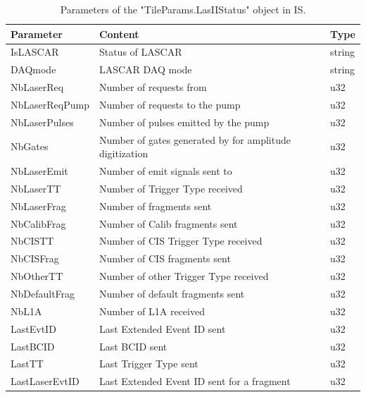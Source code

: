 \begin{appendices}
\vspace*{5cm}
\newpage


\begin{table}[htbp]
  \begin{center}
\caption{Parameters of the "TileParams.LasIIStatus" object in IS.}\label{tab:IS:lasIIstatus}
{\footnotesize
    \begin{tabular}{lll}
      \hline\hline
      Parameter & Content & Type \\
      \hline
      IsLASCAR & Status of LASCAR & string \\
      DAQmode & LASCAR DAQ mode & string \\
      NbLaserReq & Number of \las{} requests from \shaft{} & u32 \\
      NbLaserReqPump & Number of \las{} requests to the pump & u32 \\
      NbLaserPulses & Number of \las{} pulses emitted by the pump & u32 \\
      NbGates & Number of gates generated by \lascar{} for amplitude digitization & u32 \\
      NbLaserEmit & Number of \las{} emit signals sent to \shaft{} & u32 \\
      NbLaserTT & Number of \las{} Trigger Type received & u32 \\
      NbLaserFrag & Number of \las{} fragments sent & u32 \\
      NbCalibFrag & Number of Calib fragments sent & u32 \\
      NbCISTT & Number of CIS Trigger Type received & u32 \\
      NbCISFrag & Number of CIS fragments sent & u32 \\
      NbOtherTT & Number of other Trigger Type received & u32 \\
      NbDefaultFrag & Number of default fragments sent & u32 \\
      NbL1A & Number of L1A received & u32 \\
      LastEvtID & Last Extended Event ID sent & u32 \\
      LastBCID & Last BCID sent & u32 \\
      LastTT & Last Trigger Type sent & u32 \\
      LastLaserEvtID & Last Extended Event ID sent for a \las{} fragment & u32 \\

\end{tabular}}
\end{center}
\end{table}
\end{appendices}
